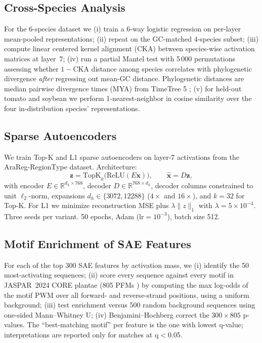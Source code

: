 \documentclass{article}
\begin{document}
\subsection{Cross-Species Analysis}
\label{sec:species-methods}

For the 6-species dataset we (i) train a 6-way logistic regression on
per-layer mean-pooled representations; (ii) repeat on the GC-matched
4-species subset; (iii) compute linear centered kernel alignment (CKA)
between species-wise activation matrices at layer~7; (iv) run a partial
Mantel test \citep{legendre2012numerical} with 5\,000 permutations assessing
whether $1{-}\text{CKA}$ distance among species correlates with phylogenetic
divergence \emph{after} regressing out mean-GC distance. Phylogenetic
distances are median pairwise divergence times (MYA) from TimeTree 5
\citep{kumar2022timetree}; (v) for held-out tomato and soybean we perform
1-nearest-neighbor in cosine similarity over the four in-distribution
species' representations.

\subsection{Sparse Autoencoders}

We train Top-K \citep{gao2024scaling} and L1 \citep{bricken2023monosemanticity}
sparse autoencoders on layer-7 activations from the AraReg-RegionType
dataset. Architecture:
\begin{equation}
    \mathbf{z} = \mathrm{TopK}_{k}\bigl(\mathrm{ReLU}(E\mathbf{x})\bigr),
    \qquad \hat{\mathbf{x}} = D\mathbf{z},
\end{equation}
with encoder $E\in\mathbb{R}^{d_h\times 768}$, decoder $D\in\mathbb{R}^{768\times d_h}$,
decoder columns constrained to unit $\ell_2$-norm, expansions
$d_h{\in}\{3072, 12288\}$ ($4\times$ and $16\times$), and $k{=}32$ for Top-K.
For L1 we minimize reconstruction MSE plus
$\lambda\|z\|_1$ with $\lambda{=}5\times10^{-4}$. Three seeds per variant. 50
epochs, Adam ($\text{lr}{=}10^{-3}$), batch size 512.

\subsection{Motif Enrichment of SAE Features}
\label{sec:motif-methods}

For each of the top 300 SAE features by activation mass, we (i) identify the
50 most-activating sequences; (ii) score every sequence against every motif in
JASPAR~2024 CORE plantae (805 PFMs \citep{rauluseviciute2024jaspar}) by
computing the max log-odds of the motif PWM over all forward- and
reverse-strand positions, using a uniform background; (iii) test enrichment
versus 500 random background sequences using one-sided Mann--Whitney U; (iv)
Benjamini--Hochberg correct the $300\times 805$ p-values. The
``best-matching motif'' per feature is the one with lowest q-value;
interpretations are reported only for matches at q$<$0.05.
\end{document}
